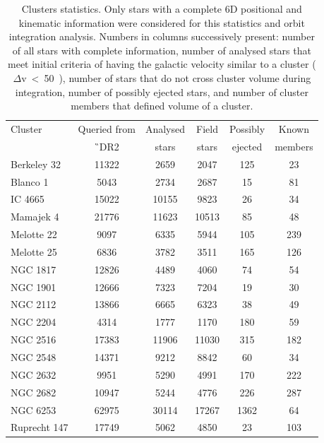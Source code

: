 \begin{table}
	\centering
	\caption{Clusters statistics. Only stars with a complete 6D positional and kinematic information were considered for this statistics and orbit integration analysis. Numbers in columns successively present: number of all stars with complete information, number of analysed stars that meet initial criteria of having the galactic velocity similar to a cluster ($\Delta$v~<~50~\kms), number of stars that do not cross cluster volume during integration, number of possibly ejected stars, and number of cluster members that defined volume of a cluster.}
	\begin{tabular}{l c c c c c }
		\hline
		Cluster & Queried from & Analysed & Field & Possibly & Known \\
		 & \G\ DR2 & stars & stars & ejected & members \\
		\hline \hline
		Berkeley 32  & 11322 & 2659 & 2047 & 125 & 23 \\ 
		Blanco 1     & 5043 & 2734 & 2687 & 15 & 81 \\
		IC 4665      & 15022 & 10155 & 9823 & 26 & 34 \\
		Mamajek 4    & 21776 & 11623 & 10513 & 85 & 48 \\
		Melotte 22   & 9097 & 6335 & 5944 & 105 & 239 \\
		Melotte 25   & 6836 & 3782 & 3511 & 165 & 126 \\
		NGC 1817     & 12826 & 4489 & 4060 & 74 & 54 \\
		NGC 1901     & 12666 & 7323 & 7204 & 19 & 30 \\
		NGC 2112     & 13866 & 6665 & 6323 & 38 & 49 \\
		NGC 2204     & 4314 & 1777 & 1170 & 180 & 59 \\
		NGC 2516     & 17383 & 11906 & 11030 & 315 & 182 \\
		NGC 2548     & 14371 & 9212 & 8842 & 60 & 34 \\
		NGC 2632     & 9951 & 5290 & 4991 & 170 & 222 \\
		NGC 2682     & 10947 & 5244 & 4776 & 226 & 287 \\
		NGC 6253     & 62975 & 30114 & 17267 & 1362 & 64 \\
		Ruprecht 147 & 17749 & 5062 & 4850 & 23 & 103 \\
		\hline
	\end{tabular}
	\label{tab:cluster_stats}
\end{table}

